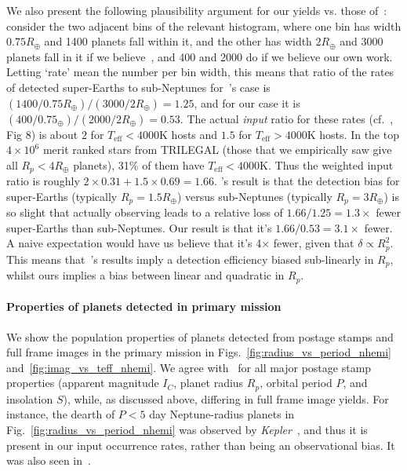 We also present the following plausibility argument for our yields vs. those of~:
consider the two adjacent bins of the relevant histogram, where one bin has width $0.75R_\oplus$ and 1400 planets fall within it, and the other has width $2R_\oplus$ and 3000 planets fall in it if we believe~, and 400 and 2000 do if we believe our own work.
Letting `rate' mean the number per bin width, this means that ratio of the rates of detected super-Earths to sub-Neptunes for~'s case is $(1400/0.75R_\oplus)/(3000/2R_\oplus)=1.25$, and for our case it is $(400/0.75_\oplus)/(2000/2R_\oplus)=0.53$.
The actual \textit{input} ratio for these rates (cf.~, Fig 8) is about $2$ for $T_\mathrm{eff}<4000$K hosts and $1.5$ for $T_\mathrm{eff}>4000$K hosts.
In the top $4\times10^6$ merit ranked stars from TRILEGAL (those that we empirically saw give all $R_p<4R_\oplus$ planets), 31\% of them have $T_\mathrm{eff} < 4000\mathrm{K}$.
Thus the weighted input ratio is roughly $2\times0.31 + 1.5\times0.69=1.66$. %
's result is that the detection bias for super-Earths (typically $R_p=1.5R_\oplus$) versus sub-Neptunes (typically $R_p=3R_\oplus$) is so slight that actually observing leads to a relative loss of $1.66/1.25=1.3\times$ fewer super-Earths than sub-Neptunes.
Our result is that it's $1.66/0.53=3.1\times$ fewer.
A naive expectation would have us believe that it's 4$\times$ fewer, given that $\delta\propto R_p^2$.
This means that~'s results imply a detection efficiency biased sub-linearly in $R_p$, whilst ours implies a bias between linear and quadratic in $R_p$.

\paragraph{Properties of planets detected in primary mission} 
We show the population properties of planets detected from postage stamps and full frame images in the primary mission in Figs.~\ref{fig:radius_vs_period_nhemi} and~\ref{fig:imag_vs_teff_nhemi}.
We agree with~ for all major postage stamp properties (apparent magnitude $I_C$, planet radius $R_p$, orbital period $P$, and insolation $S$), while, as discussed above, differing in full frame image yields.
For instance, the dearth of $P<5$ day Neptune-radius planets in Fig.~\ref{fig:radius_vs_period_nhemi} was observed by \textit{Kepler}~\citep{mazeh_dearth_2016}, and thus it is present in our input occurrence rates, rather than being an observational bias. 
It was also seen in~.

